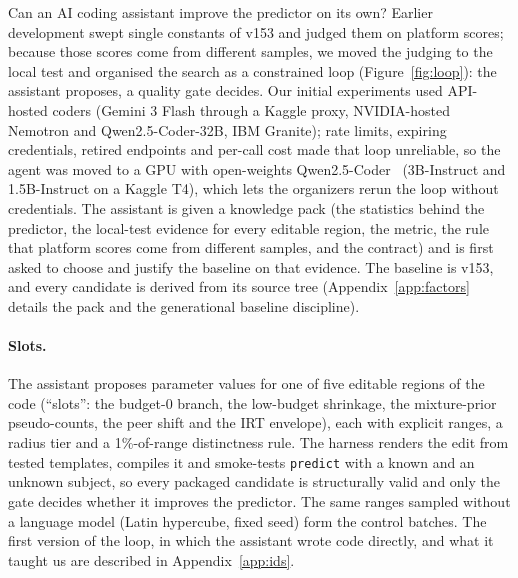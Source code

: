 \documentclass{article}
\begin{document}
Can an AI coding assistant improve the predictor on its own? Earlier development swept single constants of v153 and judged them on platform scores; because those scores come from different samples, we moved the judging to the local test and organised the search as a constrained loop (Figure~\ref{fig:loop}): the assistant proposes, a quality gate decides. Our initial experiments used API-hosted coders (Gemini 3 Flash through a Kaggle proxy, NVIDIA-hosted Nemotron and Qwen2.5-Coder-32B, IBM Granite); rate limits, expiring credentials, retired endpoints and per-call cost made that loop unreliable, so the agent was moved to a GPU with open-weights Qwen2.5-Coder~\cite{qwen} (3B-Instruct and 1.5B-Instruct on a Kaggle T4), which lets the organizers rerun the loop without credentials. The assistant is given a knowledge pack (the statistics behind the predictor, the local-test evidence for every editable region, the metric, the rule that platform scores come from different samples, and the contract) and is first asked to choose and justify the baseline on that evidence. The baseline is v153, and every candidate is derived from its source tree (Appendix~\ref{app:factors} details the pack and the generational baseline discipline).

\paragraph{Slots.} The assistant proposes parameter values for one of five editable regions of the code (``slots'': the budget-0 branch, the low-budget shrinkage, the mixture-prior pseudo-counts, the peer shift and the IRT envelope), each with explicit ranges, a radius tier and a 1\%-of-range distinctness rule. The harness renders the edit from tested templates, compiles it and smoke-tests \texttt{predict} with a known and an unknown subject, so every packaged candidate is structurally valid and only the gate decides whether it improves the predictor. The same ranges sampled without a language model (Latin hypercube, fixed seed) form the control batches. The first version of the loop, in which the assistant wrote code directly, and what it taught us are described in Appendix~\ref{app:ids}.
\end{document}
